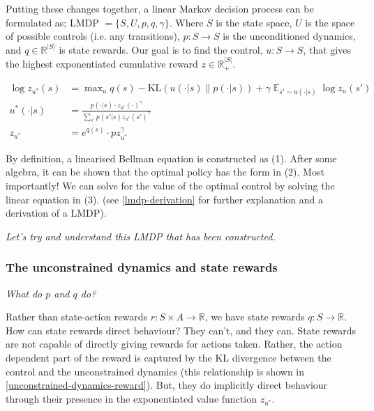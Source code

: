 

Putting these changes together, a linear Markov decision process can be formulated as;
LMDP $=\{S, U, p, q, \gamma\}$. Where $S$ is the state space, $U$ is the space of possible controls (i.e. any transitions),
$p: S \to S$ is the unconditioned dynamics, and $q \in \mathbb R^{|S|}$ is state rewards.
Our goal is to find the control, $u: S \to S$, that gives the highest exponentiated cumulative reward $z \in \mathbb R_+^{|S|}$.

\begin{align*}
\log z_{u^{* }}(s) &= \mathop{\text{max}}_{u} q(s) - \text{KL}(u(\cdot| s) \parallel p(\cdot | s)) + \gamma \mathop{\mathbb E}_{s' \sim u(\cdot | s)} \log z_{u}(s') \tag{1}\\
u^{* }(\cdot | s) &= \frac{p(\cdot | s)\cdot z_{u^{* }}(\cdot)^{\gamma}}{\sum_{s'} p(s' | s) z_{u^{* }}(s')^{\gamma}} \tag{2}\\
z_{u^{* }} &= e^{q(s)}\cdot p z_{u^{* }}^{\gamma} \tag{3}
\end{align*}

By definition, a linearised Bellman equation is constructed as (1). After some algebra,
it can be shown that the optimal policy has the form in (2).
Most importantly! We can solve for the value of the optimal control by solving the linear equation in (3).
(see \ref{lmdp-derivation} for further explanation and a derivation of a LMDP).

\begin{displayquote}
\textsl{Let's try and understand this LMDP that has been constructed.}
\end{displayquote}

\subsubsection{The unconstrained dynamics and state rewards}

\begin{displayquote}
\textsl{What do $p$ and $q$ do?}
\end{displayquote}

Rather than state-action rewards $r: S \times A \to \mathbb R$, we have state rewards $q: S \to \mathbb R$.
How can state rewards direct behaviour? They can't, and they can. State rewards are not capable of directly giving rewards for actions taken.
Rather, the action dependent part of the reward is captured by the KL divergence between
the control and the unconstrained dynamics (this relationship is shown in \ref{unconstrained-dynamics-reward}).
But, they do implicitly direct behaviour through their presence in the exponentiated value function $z_{u^{* }}$.

